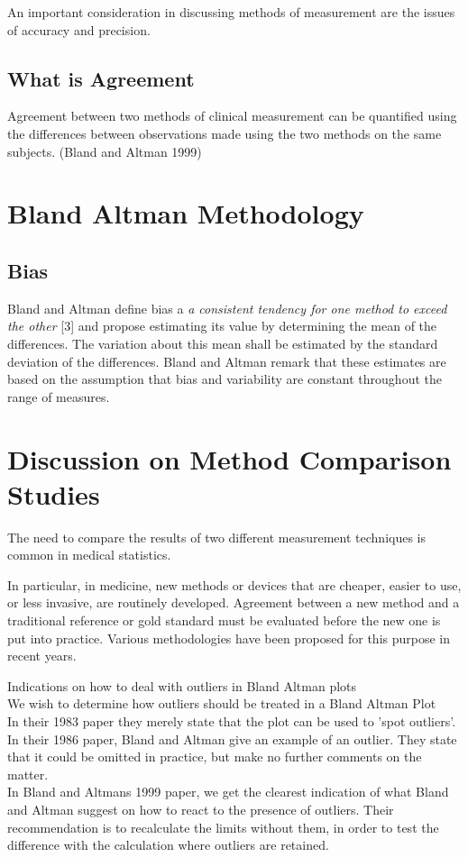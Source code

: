 \documentclass[12pt, a4paper]{report}
\begin{document}
An important consideration in discussing methods of measurement are the issues of accuracy and precision.

\subsection{What is Agreement}

Agreement between two methods of clinical measurement can be quantified using the differences between observations made using the two methods on the same subjects. (Bland and Altman 1999)


\section{Bland Altman Methodology}

\subsection{Bias}
Bland and Altman define bias a \emph{a consistent tendency for one
method to exceed the other} [$3$] and propose estimating its value
by determining the mean of the differences. The variation about
this mean shall be estimated by the  standard deviation of the
differences. Bland and Altman remark that these estimates are based on the
assumption that bias and variability are constant throughout the
range of measures.


\section{Discussion on Method Comparison Studies}

The need to compare the results of two different measurement
techniques is common in medical statistics.

In particular, in medicine, new methods or devices that are
cheaper, easier to use, or less invasive, are routinely developed.
Agreement between a new method and a traditional reference or gold
standard must be evaluated before the new one is put into
practice. Various methodologies have been proposed for this
purpose in recent years.

Indications on how to deal with outliers in Bland Altman plots
\\
We wish to determine how outliers should be treated in a Bland
Altman Plot
\\
In their 1983 paper they merely state that the plot can be used to
'spot outliers'.
\\
In  their 1986 paper, Bland and Altman give an example of an
outlier. They state that it could be omitted in practice, but make
no further comments on the matter.
\\
In Bland and Altmans 1999 paper, we get the clearest indication of
what Bland and Altman suggest on how to react to the presence of
outliers. Their recommendation is to recalculate the limits
without them, in order to test the difference with the calculation
where outliers are retained.\\
\end{document}
